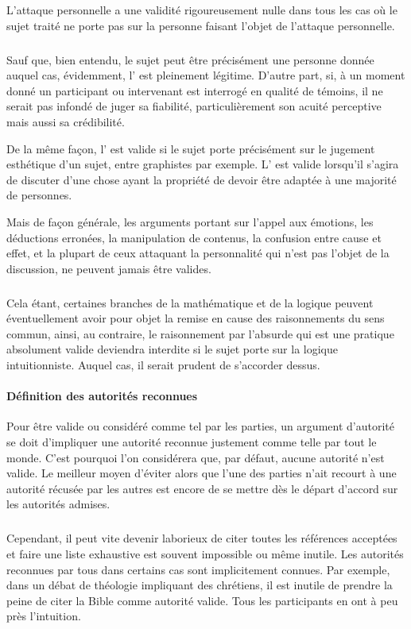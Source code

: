 L’attaque personnelle a une validité rigoureusement nulle dans tous les cas où le sujet traité ne porte pas sur la personne faisant l’objet de l’attaque personnelle.

\subparagraph{}
Sauf que, bien entendu, le sujet peut être précisément une personne donnée auquel cas, évidemment, l’ est pleinement légitime. D’autre part, si, à un moment donné un participant ou intervenant est interrogé en qualité de témoins, il ne serait pas infondé de juger sa fiabilité, particulièrement son acuité perceptive mais aussi sa crédibilité.

De la même façon, l’ est valide si le sujet porte précisément sur le jugement esthétique d’un sujet, entre graphistes par exemple. L’ est valide lorsqu’il s’agira de discuter d’une chose ayant la propriété de devoir être adaptée à une majorité de personnes.

Mais de façon générale, les arguments portant sur l’appel aux émotions, les déductions erronées, la manipulation de contenus, la confusion entre cause et effet, et la plupart de ceux attaquant la personnalité qui n’est pas l’objet de la discussion, ne peuvent jamais être valides.

\subparagraph{}
Cela étant, certaines branches de la mathématique et de la logique peuvent éventuellement avoir pour objet la remise en cause des raisonnements du sens commun, ainsi, au contraire, le raisonnement par l’absurde qui est une pratique absolument valide deviendra interdite si le sujet porte sur la logique intuitionniste. Auquel cas, il serait prudent de s’accorder dessus.

\paragraph{Définition des autorités reconnues} Pour être valide ou considéré comme tel par les parties, un argument d’autorité se doit d’impliquer une autorité reconnue justement comme telle par tout le monde. C’est pourquoi l’on considérera que, par défaut, aucune autorité n’est valide. Le meilleur moyen d’éviter alors que l’une des parties n’ait recourt à une autorité récusée par les autres est encore de se mettre dès le départ d’accord sur les autorités admises.

\subparagraph{}
Cependant, il peut vite devenir laborieux de citer toutes les références acceptées et faire une liste exhaustive est souvent impossible ou même inutile. Les autorités reconnues par tous dans certains cas sont implicitement connues. Par exemple, dans un débat de théologie impliquant des chrétiens, il est inutile de prendre la peine de citer la Bible comme autorité valide. Tous les participants en ont à peu près l’intuition.

